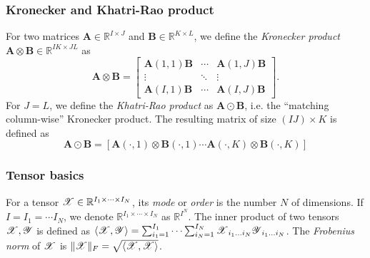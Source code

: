 \subsubsection{Kronecker and Khatri-Rao product}
For two matrices $\mathbf{A} \in \mathbb{R}^{I \times J}$ and $\mathbf{B} \in \mathbb{R}^{K \times L}$,
we define the \textit{Kronecker product}
$\mathbf{A} \otimes \mathbf{B} \in \mathbb{R}^{IK \times JL}$ as
\begin{equation}\label{kronecker}
\mathbf{A} \otimes \mathbf{B} = \left[
\begin{array}{ccc}
\mathbf{A}(1,1)\mathbf{B}  & \cdots & \mathbf{A}(1,J)\mathbf{B} \\
\vdots & \ddots & \vdots \\
\mathbf{A}(I,1)\mathbf{B} & \cdots &   \mathbf{A}(I,J)\mathbf{B}
\end{array}
\right].
\end{equation}
For $J = L$, we define the \textit{Khatri-Rao product} as $\mathbf{A} \odot \mathbf{B}$, i.e. the ``matching column-wise'' Kronecker product.
The resulting matrix of size $(IJ) \times K$ is defined as
\[\mathbf{A} \odot \mathbf{B} = [\mathbf{A}(\cdot,1) \otimes \mathbf{B}(\cdot,1) \cdots \mathbf{A}(\cdot,K) \otimes \mathbf{B}(\cdot,K) ] \]


\subsubsection{Tensor basics}
For a tensor $\T{X} \in \mathbb{R}^{I_1 \times \cdots \times I_N}$,
its \textit{mode} or \textit{order} is the number $N$ of dimensions.
If $I = I_1 = \cdots I_N$, we denote $\mathbb{R}^{I_1 \times \cdots \times I_N}$ as $\mathbb{R}^{I^N}$.
The inner product of two tensors $\T{X}, \T{Y}$ is defined as
$\langle\T{X}, \T{Y}\rangle = \sum_{i_1=1}^{I_1}\cdots \sum_{i_N=1}^{I_N}\T{X}_{i_1\dots i_N}\T{Y}_{i_1\dots i_N}$.
The \textit{Frobenius norm} of $\T{X}$ is
$\|\T{X}\|_F = \sqrt{\langle\T{X},\T{X}\rangle}$.

